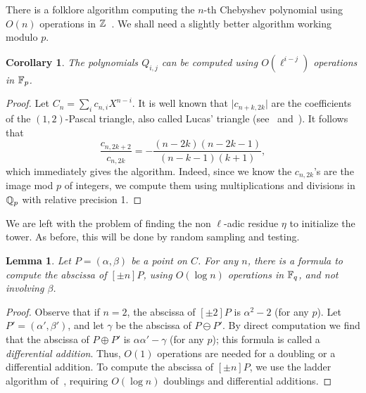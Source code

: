 \documentclass{sig-alternate}
\newtheorem{lemma}[definition]{Lemma}
\newtheorem{corollary}[definition]{Corollary}
\begin{document}
There is a folklore algorithm computing the $n$-th Chebyshev
polynomial using $O(n)$ operations in
$\mathbb{Z}$~\cite{koepf1999chebyshev}. We shall need a slightly better
algorithm working modulo $p$.

\begin{corollary}
  The polynomials $Q_{i,j}$ can be computed using $O(\ell^{i-j})$
  operations in $\mathbb{F}_p$.
\end{corollary}
\begin{proof}
  Let $C_n = \sum_i c_{n,i}X^{n-i}$. It is well known that $\lvert
  c_{n+k,2k}\rvert$ are the coefficients of the $(1,2)$-Pascal
  triangle, also called Lucas' triangle
  (see~\cite[Prop.~6.6]{silverman2007arithmetic}
  and~\cite{benjamin10}). It follows that
  \begin{equation*}
    \frac{c_{n,2k+2}}{c_{n,2k}} = 
    -\frac{(n-2k)(n-2k-1)}{(n-k-1)(k+1)},
  \end{equation*}
  which immediately gives the algorithm. Indeed, since we know the
  $c_{n,2k}$'s are the image mod $p$ of integers, we compute them
  using multiplications and divisions in $\mathbb{Q}_p$ with relative
  precision 1.
\end{proof}

We are left with the problem of finding the non $\ell$-adic residue
$\eta$ to initialize the tower. As before, this will be done by random
sampling and testing.

\begin{lemma}
  \label{th:montgomery}
  Let $P=(\alpha,\beta)$ be a point on $C$. For any $n$, there is a
  formula to compute the abscissa of $[\pm n]P$, using $O(\log n)$
  operations in $\mathbb{F}_q$, and not involving $\beta$.
\end{lemma}
\begin{proof}
  Observe that if $n=2$, the abscissa of $[\pm 2]P$ is $\alpha^2-2$
  (for any $p$).  Let $P'=(\alpha',\beta')$, and let $\gamma$ be the
  abscissa of $P\ominus P'$. By direct computation we find that the
  abscissa of $P\oplus P'$ is $\alpha\alpha'-\gamma$ (for any $p$);
  this formula is called a \emph{differential addition}.  Thus, $O(1)$
  operations are needed for a doubling or a differential addition. To
  compute the abscissa of $[\pm n]P$, we use the ladder algorithm
  of~\cite{montgomery}, requiring $O(\log n)$ doublings and
  differential additions.
\end{proof}
\end{document}
